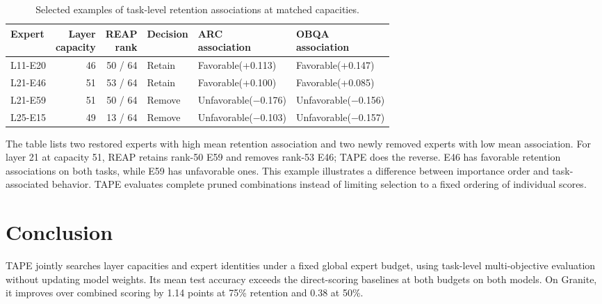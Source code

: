 \documentclass{article}
\begin{document}
\begin{table}[htbp]
\centering\small
\caption{Selected examples of task-level retention associations at matched capacities.}
\label{tab:association}
\begin{tabularx}{\linewidth}{@{}lrrlXX@{}}
\toprule
Expert & \shortstack{Layer\\capacity} & \shortstack{REAP\\rank} & Decision & \shortstack{ARC\\association} & \shortstack{OBQA\\association} \\
\midrule
L11-E20 & 46 & 50 / 64 & Retain & Favorable\newline(+0.113) & Favorable\newline(+0.147) \\
L21-E46 & 51 & 53 / 64 & Retain & Favorable\newline(+0.100) & Favorable\newline(+0.085) \\
L21-E59 & 51 & 50 / 64 & Remove & Unfavorable\newline(\ensuremath{-}0.176) & Unfavorable\newline(\ensuremath{-}0.156) \\
L25-E15 & 49 & 13 / 64 & Remove & Unfavorable\newline(\ensuremath{-}0.103) & Unfavorable\newline(\ensuremath{-}0.157) \\
\bottomrule
\end{tabularx}
\end{table}

The table lists two restored experts with high mean retention association and two newly removed experts with low mean association. For layer 21 at capacity 51, REAP retains rank-50 E59 and removes rank-53 E46; TAPE does the reverse. E46 has favorable retention associations on both tasks, while E59 has unfavorable ones. This example illustrates a difference between importance order and task-associated behavior. TAPE evaluates complete pruned combinations instead of limiting selection to a fixed ordering of individual scores.

\section{Conclusion}
\label{sec:7}
TAPE jointly searches layer capacities and expert identities under a fixed global expert budget, using task-level multi-objective evaluation without updating model weights. Its mean test accuracy exceeds the direct-scoring baselines at both budgets on both models. On Granite, it improves over combined scoring by 1.14 points at 75\% retention and 0.38 at 50\%.
\end{document}
